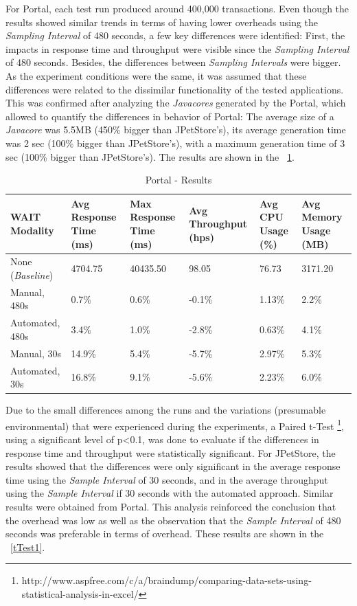 \documentclass[runningheads,a4paper]{llncs}
\begin{document}
For Portal, each test run produced around 400,000 transactions. Even though the
results showed similar trends in terms of having lower overheads using the
\emph{Sampling Interval} of 480 seconds, a few key differences were identified:
First, the impacts in response time and throughput were visible since the
\emph{Sampling Interval} of 480 seconds. Besides, the differences between
\emph{Sampling Intervals} were bigger. As the experiment conditions were the
same, it was assumed that these differences were related to the dissimilar
functionality of the tested applications. This was confirmed after analyzing the
\emph{Javacores} generated by the Portal, which allowed to quantify the
differences in behavior of Portal: The average size of a \emph{Javacore} was
5.5MB (450\% bigger than JPetStore's), its average generation time was 2 sec
(100\% bigger than JPetStore's), with a maximum generation time of 3 sec (100\%
bigger than JPetStore's). The results are shown in the \tablename ~\ref{Portal1}.

\begin{table}[!h]
\caption{Portal - Results}
\label{Portal1}
\centering
\begin{tabular}{p{}|p{}|p{}|p{}|p{}|p{}}
\hline
\bfseries WAIT Modality & \bfseries Avg Response Time (ms)& \bfseries Max
Response Time (ms)& \bfseries Avg Throughput (hps)& \bfseries Avg CPU Usage
(\%) & \bfseries Avg Memory Usage (MB)\\
\hline
None (\emph{Baseline}) 	& 4704.75	& 40435.50	& 98.05 	& 76.73 	& 3171.20\\
Manual, 480s 			& 0.7\% 	& 0.6\%		& -0.1\%	& 1.13\% 	& 2.2\%\\
Automated, 480s 		& 3.4\%		& 1.0\%		& -2.8\% 	& 0.63\% 	& 4.1\%\\
Manual, 30s 			& 14.9\%	& 5.4\%		& -5.7\% 	& 2.97\% 	& 5.3\%\\
Automated, 30s 			& 16.8\%	& 9.1\%		& -5.6\% 	& 2.23\% 	& 6.0\%\\
\hline
\end{tabular}
\end{table}

Due to the small differences among the runs and the variations (presumable
environmental) that were experienced during the experiments, a Paired t-Test
\footnote{http://www.aspfree.com/c/a/braindump/comparing-data-sets-using-statistical-analysis-in-excel/},
using a significant level of p<0.1, was done to evaluate if the differences in
response time and throughput were statistically significant. For JPetStore, the
results showed that the differences were only significant in the average
response time using the \emph{Sample Interval} of 30 seconds, and in the average
throughput using the \emph{Sample Interval} if 30 seconds with the automated
approach. Similar results were obtained from Portal. This analysis reinforced
the conclusion that the overhead was low as well as the observation that the
\emph{Sample Interval} of 480 seconds was preferable in terms of overhead. These
results are shown in the \tablename ~\ref{tTest1}.
\end{document}
